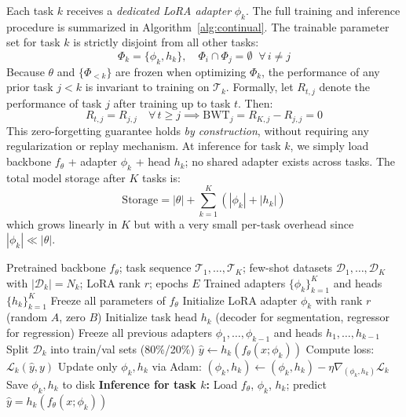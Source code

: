 \documentclass[journal,twoside,web]{ieeecolor}
\begin{document}
Each task $k$ receives a \emph{dedicated LoRA adapter} $\phi_k$. The full training and inference procedure is summarized in Algorithm~\ref{alg:continual}. The trainable parameter set for task $k$ is strictly disjoint from all other tasks:
\begin{equation}
\Phi_k = \{\phi_k, h_k\}, \quad \Phi_i \cap \Phi_j = \emptyset \;\; \forall \, i \neq j
\label{eq:disjoint}
\end{equation}
Because $\theta$ and $\{\Phi_{<k}\}$ are frozen when optimizing $\Phi_k$, the performance of any prior task $j < k$ is invariant to training on $\mathcal{T}_k$. Formally, let $R_{t,j}$ denote the performance of task $j$ after training up to task $t$. Then:
\begin{equation}
R_{t,j} = R_{j,j} \quad \forall \, t \geq j \implies \text{BWT}_j = R_{K,j} - R_{j,j} = 0
\label{eq:bwt_zero}
\end{equation}
This zero-forgetting guarantee holds \emph{by construction}, without requiring any regularization or replay mechanism. At inference for task $k$, we simply load backbone $f_\theta$ + adapter $\phi_k$ + head $h_k$; no shared adapter exists across tasks. The total model storage after $K$ tasks is:
\begin{equation}
\text{Storage} = |\theta| + \sum_{k=1}^{K} (|\phi_k| + |h_k|)
\label{eq:storage}
\end{equation}
which grows linearly in $K$ but with a very small per-task overhead since $|\phi_k| \ll |\theta|$.

\begin{algorithm}[t]
\caption{Continual Learning via LoRA Adapter Isolation}
\label{alg:continual}
\begin{algorithmic}[1]
\REQUIRE Pretrained backbone $f_\theta$; task sequence $\mathcal{T}_1, \ldots, \mathcal{T}_K$; few-shot datasets $\mathcal{D}_1, \ldots, \mathcal{D}_K$ with $|\mathcal{D}_k| = N_k$; LoRA rank $r$; epochs $E$
\ENSURE Trained adapters $\{\phi_k\}_{k=1}^K$ and heads $\{h_k\}_{k=1}^K$
\STATE Freeze all parameters of $f_\theta$
    \STATE Initialize LoRA adapter $\phi_k$ with rank $r$ (random $A$, zero $B$)
    \STATE Initialize task head $h_k$ (decoder for segmentation, regressor for regression)
        \STATE Freeze all previous adapters $\phi_1, \ldots, \phi_{k-1}$ and heads $h_1, \ldots, h_{k-1}$
    \ENDIF
    \STATE Split $\mathcal{D}_k$ into train/val sets (80\%/20\%)
            \STATE $\hat{y} \leftarrow h_k(f_\theta(x; \phi_k))$ 
            \STATE Compute loss: $\mathcal{L}_k(\hat{y}, y)$ 
            \STATE Update only $\phi_k, h_k$ via Adam: $(\phi_k, h_k) \leftarrow (\phi_k, h_k) - \eta \nabla_{(\phi_k, h_k)} \mathcal{L}_k$
        \ENDFOR
    \ENDFOR
    \STATE Save $\phi_k, h_k$ to disk
\ENDFOR
\STATE \textbf{Inference for task $k$:} Load $f_\theta$, $\phi_k$, $h_k$; predict $\hat{y} = h_k(f_\theta(x; \phi_k))$
\end{algorithmic}
\end{algorithm}
\end{document}
